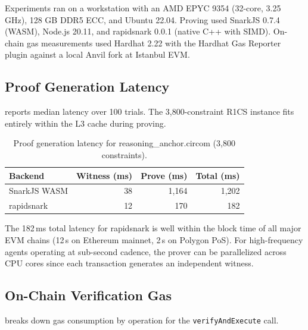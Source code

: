 \documentclass[final,5p,times,twocolumn]{elsarticle}
\theoremstyle{plain}
\theoremstyle{definition}
\theoremstyle{remark}
\begin{document}
Experiments ran on a workstation with an AMD EPYC 9354 (32-core, 3.25 GHz),
128 GB DDR5 ECC, and Ubuntu 22.04. Proving used SnarkJS 0.7.4 (WASM), Node.js
20.11, and rapidsnark 0.0.1 (native C++ with SIMD). On-chain gas measurements
used Hardhat 2.22 with the Hardhat Gas Reporter plugin against a local Anvil
fork at Istanbul EVM.

\subsection{Proof Generation Latency}

 reports median latency over 100 trials. The
3,800-constraint R1CS instance fits entirely within the L3 cache during proving.

\begin{table}[h]
\centering
\caption{Proof generation latency for reasoning\_anchor.circom (3,800 constraints).}
\label{tab:proving_time}
\begin{tabular}{lrrr}
\toprule
\textbf{Backend} & \textbf{Witness (ms)} & \textbf{Prove (ms)} & \textbf{Total (ms)} \\
\midrule
SnarkJS WASM     & 38 & 1{,}164 & 1{,}202 \\
rapidsnark       & 12 &    170  &    182 \\
\bottomrule
\end{tabular}
\end{table}

The 182\,ms total latency for rapidsnark is well within the block time of
all major EVM chains (12\,s on Ethereum mainnet, 2\,s on Polygon PoS). For
high-frequency agents operating at sub-second cadence, the prover can be
parallelized across CPU cores since each transaction generates an independent
witness.

\subsection{On-Chain Verification Gas}

 breaks down gas consumption by operation for the
\texttt{verifyAndExecute} call.
\end{document}
